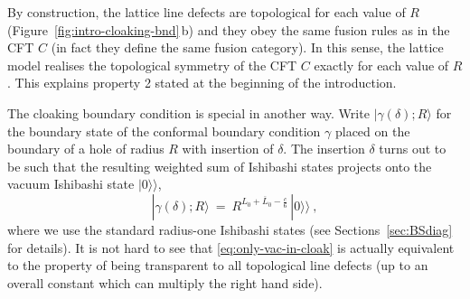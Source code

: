 \documentclass[11pt,a4paper]{article}
\numberwithin{equation}{section}
\begin{document}
By construction, the lattice line defects are topological for each value of $R$ (Figure~\ref{fig:intro-cloaking-bnd}\,b) and they obey the same fusion rules as in the CFT $C$ (in fact they define the same fusion category). In this sense, the lattice model realises the topological symmetry of the CFT $C$ exactly for each value of $R$.
This explains property 2 stated at the beginning of the introduction.

\medskip

The cloaking boundary condition is special in another way. Write $|\gamma(\delta);R\rangle$ for the boundary state of the conformal boundary condition $\gamma$ placed on the boundary of a hole of radius $R$ with insertion of $\delta$. The insertion $\delta$ turns out to be such that the resulting weighted sum of Ishibashi states projects onto the vacuum Ishibashi state $|0\rangle\!\rangle$,
\begin{equation}\label{eq:only-vac-in-cloak}
|\gamma(\delta);R\rangle ~=~ R^{L_0+\overline L_0 - \frac c6} \, |0\rangle\!\rangle ~,
\end{equation}
where we use the standard radius-one Ishibashi states (see Sections~\ref{sec:BSdiag} 
for details). It is not hard to see that \eqref{eq:only-vac-in-cloak} 
is actually equivalent to the property of being transparent to all topological line defects (up to an overall constant which can multiply the right hand side).
\end{document}
